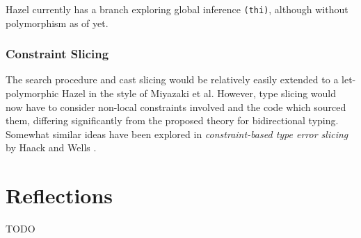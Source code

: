 Hazel currently has a branch exploring global inference \texttt{(thi)}, although without polymorphism as of yet.

\subsubsection{Constraint Slicing}
The search procedure and cast slicing would be relatively easily extended to a let-polymorphic Hazel in the style of Miyazaki et al. However, type slicing would now have to consider non-local constraints involved and the code which sourced them, differing significantly from the proposed theory for bidirectional typing. Somewhat similar ideas have been explored in \textit{constraint-based type error slicing} by Haack and Wells \cite{HaackErrSlice}.

\section{Reflections}
TODO